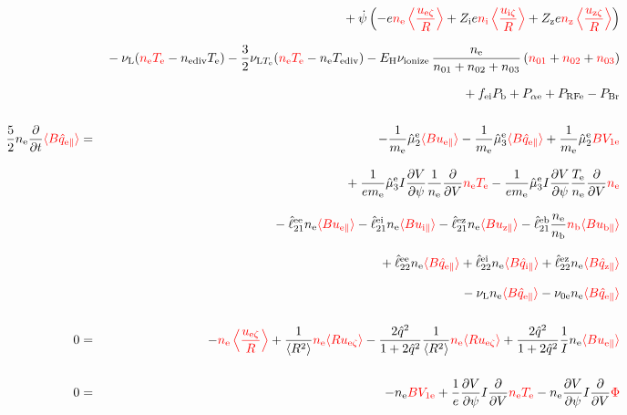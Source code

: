 \documentclass[11pt]{article}
\def\r#1{{\rm#1}}
\def\ave#1{\left\langle#1\right\rangle}
\def\aves#1{\langle#1\rangle}
\def\dd#1#2{\frac{\partial #1}{\partial #2}}
\def\para{\parallel}
\def\ddV{\frac{\partial}{\partial V}}
\def\ddt{\frac{\partial}{\partial t}}
\def\me{m_\r{e}}
\def\mb{m_\r{b}}
\def\nee{n_\r{e}}
\def\ni{n_\r{i}}
\def\nz{n_\r{z}}
\def\nb{n_\r{b}}
\def\Te{T_\r{e}}
\def\Zi{Z_\r{i}}
\def\Zz{Z_\r{z}}
\def\uzt#1{u_{\r{#1}\zeta}}
\def\upara#1{u_{\r{#1}\para}}
\def\qhatpara#1{\hat{q}_{\r{#1}\para}}
\def\nun#1{\nu_\r{0#1}}
\def\ndiv#1{n_\r{#1div}}
\def\Tdiv#1{T_\r{#1div}}
\def\nuLT#1{\nu_{\r{L}T_\r{#1}}}
\def\PRF#1{P_\r{RF#1}}
\def\Palp#1{P_{\alpha\r{#1}}}
\def\fei{f_\r{ei}}
\def\PBr{P_\r{Br}}
\def\Pb{P_\r{b}}
\def\Eb{E_\r{b}}
\def\EH{E_\r{H}}
\def\nna{n_{01}}
\def\nnb{n_{02}}
\def\nnc{n_{03}}
\def\nuL{\nu_\r{L}}
\def\nuion{\nu_\r{ionize}}
\def\red#1{\textcolor{red}{#1}}
\begin{document}
\begin{eqnarray}
%
\nonumber\\[2.5mm]&&{}
%
  +\dot{\psi}\left(-     e \red{\nee \ave{\frac{\uzt{e}}{R}}}
	           + \Zi e \red{\ni  \ave{\frac{\uzt{i}}{R}}}
	           + \Zz e \red{\nz  \ave{\frac{\uzt{z}}{R}}}\right)
\nonumber\\[2.5mm]&&{}
%
  - \nuL (\red{\nee\Te} - \ndiv{e}\Te)
%
  - \frac{3}{2} \nuLT{e} (\red{\nee\Te} - \nee\Tdiv{e})
%
  - \EH \nuion\, \frac{\nee}{\nna + \nnb + \nnc}\, (\red{\nna} + \red{\nnb} + \red{\nnc})
\nonumber\\[2.5mm]&&{}
%
  + \fei \Pb
%
%
  + \Palp{e}
%
  + \PRF{e}
%
  - \PBr
\\[5mm]
 \frac{5}{2} \nee \ddt \red{\aves{B \qhatpara{e}}} &=&
%
  - \frac{1}{\me} \hat{\mu}_2^\r{e} \red{\aves{B \upara{e}}}
  - \frac{1}{\me} \hat{\mu}_3^\r{e} \red{\aves{B \qhatpara{e}}}
%
  + \frac{1}{\me} \hat{\mu}_2^\r{e} \red{B V_{1\r{e}}}
\nonumber\\[3mm]&&{}
%
  + \frac{1}{e\me} \hat{\mu}_3^\r{e} I \dd{V}{\psi} \frac{1}{\nee} \ddV
  \red{\nee \Te}
  - \frac{1}{e\me} \hat{\mu}_3^\r{e} I \dd{V}{\psi} \frac{\Te}{\nee} \ddV
  \red{\nee}
\nonumber\\[3mm]&&{}
%
  - \hat{\ell}_{21}^{\r{ee}} \nee \red{\aves{B \upara{e}}}
  - \hat{\ell}_{21}^{\r{ei}} \nee \red{\aves{B \upara{i}}}
  - \hat{\ell}_{21}^{\r{ez}} \nee \red{\aves{B \upara{z}}}
  - \hat{\ell}_{21}^{\r{eb}} \frac{\nee}{\nb} \red{\nb \aves{B \upara{b}}}
\nonumber\\[3mm]&&{}
%
  + \hat{\ell}_{22}^{\r{ee}} \nee \red{\aves{B \qhatpara{e}}}
  + \hat{\ell}_{22}^{\r{ei}} \nee \red{\aves{B \qhatpara{i}}}
  + \hat{\ell}_{22}^{\r{ez}} \nee \red{\aves{B \qhatpara{z}}}
\nonumber\\[3mm]&&{}
%
  - \nuL \nee \red{\aves{B \qhatpara{e}}}
%
  - \nun{e} \nee \red{\aves{B \qhatpara{e}}}
\\[5mm]
    0 &=&
%
  - \red{\nee \ave{\frac{\uzt{e}}{R}}}
%
  + \frac{1}{\aves{R^2}} \red{\nee \aves{R\uzt{e}}}
%
  - \frac{2\hat{q}^2}{1+2\hat{q}^2} \frac{1}{\aves{R^2}}\red{\nee\aves{R\uzt{e}}}
%
  + \frac{2\hat{q}^2}{1+2\hat{q}^2} \frac{1}{I}\nee \red{\aves{B\upara{e}}}
\\[5mm]
    0 &=&
%
  - \nee \red{BV_{1\r{e}}}
%
  + \frac{1}{e} \dd{V}{\psi} I \ddV \red{\nee\Te}
%
  - \nee \dd{V}{\psi} I \ddV \red{\Phi}
\end{eqnarray}
%
\end{document}
